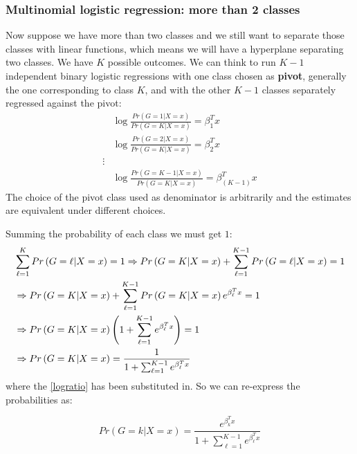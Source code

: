 \documentclass[12pt, letterpaper]{article}
\theoremstyle{definition}
\DeclarePairedDelimiter\autobracket{(}{)}
\newcommand{\br}[1]{\autobracket*{#1}}
\begin{document}
\subsubsection{Multinomial logistic regression: more than 2 classes}
Now suppose we have more than two classes and we still want to separate those classes with linear functions, which means we will have a hyperplane separating two classes. We have $K$ possible outcomes. We can think to run $K-1$ independent binary logistic regressions with one class chosen as \textbf{pivot}, generally the one corresponding to class $K$, and with the other $K-1$ classes separately regressed against the pivot:
\begin{equation}
\begin{aligned}
&\log \frac{Pr\left(G=1|X=x\right)}{Pr\left(G=K|X=x\right)} = \beta_1^T x \\
&\log \frac{Pr\left(G=2|X=x\right)}{Pr\left(G=K|X=x\right)} = \beta_2^T x\\
\vdots\\
&\log \frac{Pr\left(G=K-1|X=x\right)}{Pr\left(G=K|X=x\right)} = \beta_{\left(K-1\right)}^T x
\end{aligned}
\label{logratio}
\end{equation}
The choice of the pivot class used as denominator is arbitrarily and the estimates are equivalent under different choices.

Summing the probability of each class we must get $1$:
\begin{equation}
\begin{aligned}
&\sum_{\ell=1}^{K} Pr\left(G=\ell|X=x\right) = 1 \Rightarrow Pr\left(G=K|X=x\right)+ \sum_{\ell=1}^{K-1} Pr\left(G=\ell|X=x\right)=1\\
&\Rightarrow Pr\left(G=K|X=x\right) +\sum_{\ell=1}^{K-1} Pr\left(G=K|X=x\right)e^{\beta_\ell^Tx}=1\\
&\Rightarrow Pr\left(G=K|X=x\right) \br{1+\sum_{\ell=1}^{K-1} e^{\beta_\ell^Tx}}=1\\
&\Rightarrow Pr\left(G=K|X=x\right)= \frac{1}{1+\sum_{\ell=1}^{K-1} e^{\beta_\ell^Tx}}
\end{aligned}
\end{equation}
where the \autoref{logratio} has been substituted in.
So we can re-express the probabilities as:

\begin{equation}
Pr\left(G=k|X=x\right) = \frac{e^{\beta_{k}^T x}}{1+\sum_{\ell=1}^{K-1} e^{\beta_\ell^Tx}}
\end{equation}
\end{document}
